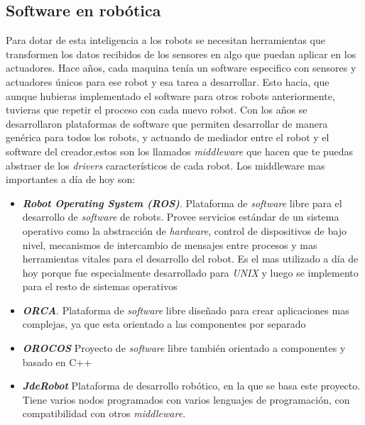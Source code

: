 \subsection{Software en robótica}
\label{subsec:softwarerobot}
Para dotar de esta inteligencia a los robots se necesitan herramientas que transformen los datos recibidos de los sensores en algo que puedan aplicar en los actuadores. Hace años, cada maquina tenía un software especifico con sensores y actuadores únicos para ese robot y esa tarea a desarrollar. Esto hacia, que aunque hubieras implementado el software para otros robots anteriormente, tuvieras que repetir el proceso con cada nuevo robot. Con los años se desarrollaron plataformas de software que permiten desarrollar de manera genérica para todos los robots, y actuando de mediador entre el robot y el software del creador,estos son los llamados \textit{middleware} que hacen que te puedas abstraer de los \textit{drivers} característicos de cada robot. Los middleware mas importantes a día de hoy son:
\begin{itemize}
    \item \textit{\textbf{Robot Operating System (ROS)}}\cite{bib:ros}. Plataforma de \textit{software} libre para el desarrollo de \textit{software} de robots. Provee servicios estándar de un sistema operativo como la abstracción de \textit{hardware}, control de dispositivos de bajo nivel, mecanismos de intercambio de mensajes entre procesos y mas herramientas vitales para el desarrollo del robot. Es el mas utilizado a día de hoy porque fue especialmente desarrollado para \textit{UNIX} y luego se implemento para el resto de sistemas operativos
    \item \textit{\textbf{ORCA}}\cite{bib:orca}. Plataforma de \textit{software} libre diseñado para crear aplicaciones mas complejas, ya que esta orientado a las componentes por separado
     \item \textit{\textbf{OROCOS}}\cite{bib:orocos} Proyecto de \textit{software} libre también orientado a componentes y basado en C++
      \item \textit{\textbf{JdeRobot}}\cite{bib:jderobot} Plataforma de desarrollo robótico, en la que se basa este proyecto. Tiene varios nodos programados  con varios lenguajes de programación, con compatibilidad con otros \textit{middleware}.
\end{itemize}{}


